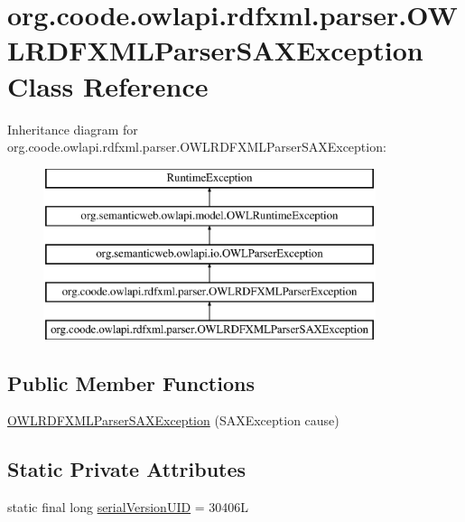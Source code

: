 \hypertarget{classorg_1_1coode_1_1owlapi_1_1rdfxml_1_1parser_1_1_o_w_l_r_d_f_x_m_l_parser_s_a_x_exception}{\section{org.\-coode.\-owlapi.\-rdfxml.\-parser.\-O\-W\-L\-R\-D\-F\-X\-M\-L\-Parser\-S\-A\-X\-Exception Class Reference}
\label{classorg_1_1coode_1_1owlapi_1_1rdfxml_1_1parser_1_1_o_w_l_r_d_f_x_m_l_parser_s_a_x_exception}
}
Inheritance diagram for org.\-coode.\-owlapi.\-rdfxml.\-parser.\-O\-W\-L\-R\-D\-F\-X\-M\-L\-Parser\-S\-A\-X\-Exception\-:\begin{figure}[H]
\begin{center}
\leavevmode
\includegraphics[height=5.000000cm]{classorg_1_1coode_1_1owlapi_1_1rdfxml_1_1parser_1_1_o_w_l_r_d_f_x_m_l_parser_s_a_x_exception}
\end{center}
\end{figure}
\subsection*{Public Member Functions}
\begin{DoxyCompactItemize}
\item 
\hyperlink{classorg_1_1coode_1_1owlapi_1_1rdfxml_1_1parser_1_1_o_w_l_r_d_f_x_m_l_parser_s_a_x_exception_a5c033d3d21b9e23641f2bc995cc18880}{O\-W\-L\-R\-D\-F\-X\-M\-L\-Parser\-S\-A\-X\-Exception} (S\-A\-X\-Exception cause)
\end{DoxyCompactItemize}
\subsection*{Static Private Attributes}
\begin{DoxyCompactItemize}
\item 
static final long \hyperlink{classorg_1_1coode_1_1owlapi_1_1rdfxml_1_1parser_1_1_o_w_l_r_d_f_x_m_l_parser_s_a_x_exception_a4ad8c064f9d10904e27efbc81320f5ca}{serial\-Version\-U\-I\-D} = 30406\-L
\end{DoxyCompactItemize}


